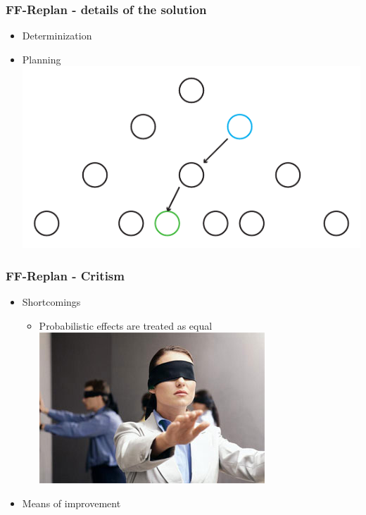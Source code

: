 \documentclass{beamer}
\let\origframetitle=\frametitle
\renewcommand\frametitle[1]{\origframetitle{\textbf{\large{\textrm{#1}}}}}
\begin{document}
\begin{frame}
  \frametitle{FF-Replan - details of the solution}

  \begin{itemize}
    \item Determinization
    \item Planning
 \includegraphics[width=\textwidth]{images/replan5.pdf}
   \end{itemize}
\end{frame}

\begin{frame}
  \frametitle{FF-Replan - Critism}

  \begin{itemize}
    \item Shortcomings
      \begin{itemize}
        \item Probabilistic effects are treated as equal
          \includegraphics[scale=0.5]{images/blindfold.jpg}
      \end{itemize}
    \item Means of improvement
  \end{itemize}
\end{frame}
\end{document}
